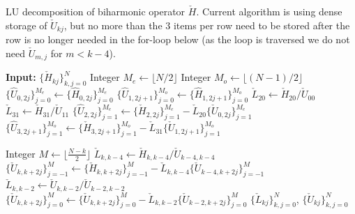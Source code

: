 \documentclass[11pt, oneside]{elsarticle}
\newcommand{\N}[1]{\check{#1}}
\begin{document}
\begin{algorithm}
	\caption{LU decomposition of biharmonic operator $\N{H}$. Current algorithm 
	is using dense storage of $\N{U}_{kj}$, but no more than the 3 items per row
	need 
	to be stored after the row is no longer needed in the for-loop below (as the loop is traversed we do not need $\N{U}_{m, j}$ for $m<k-4$). \label{alg:lu_biharmonic}}
	\begin{algorithmic}[1]
			\State \textbf{Input:} $\{\N{H}_{kj}\}_{k, j = 0}^{N}$
			\State Integer $M_e \gets \lfloor N/2 \rfloor$
			\State Integer $M_o \gets \lfloor (N-1)/2 \rfloor$  
	        \State $\{\hat{U}_{0,2j}\}_{j=0}^{M_e} \gets \{\hat{H}_{0,2j}\}_{j=0}^{M_e}$ 
	        \State $\{\hat{U}_{1,2j+1}\}_{j=0}^{M_o} \gets \{\hat{H}_{1,2j+1}\}_{j=0}^{M_o}$ 
	        \State $\N{L}_{20} \gets \N{H}_{20}/\N{U}_{00}$
	        \State $\N{L}_{31} \gets \N{H}_{31}/\N{U}_{11}$
	        \State $\{\hat{U}_{2,2j}\}_{j=1}^{M_e} \gets \{\N{H}_{2,2j}\}_{j=1}^{M_e} - \N{L}_{20} \{\N{U}_{0,2j}\}_{j=1}^{M_e}$
	        \State $\{\hat{U}_{3,2j+1}\}_{j=1}^{M_o} \gets \{\N{H}_{3,2j+1}\}_{j=1}^{M_o} - \N{L}_{31} \{\N{U}_{1,2j+1}\}_{j=1}^{M_o}$

	            \State Integer $M \gets \lfloor \frac{N-k}{2}\rfloor$
		        \State $\N{L}_{k,k-4} \gets \N{H}_{k, k-4} / \N{U}_{k-4, k-4}$
		        \State $\{\N{U}_{k,k+2j}\}_{j=-1}^{M} \gets \{\N{H}_{k,k+2j}\}_{j=-1}^{M} - \N{L}_{k, k-4} 
		        \{\N{U}_{k-4, k+2j}\}_{j=-1}^{M}$
	            \State $\N{L}_{k,k-2} \gets {\N{U}}_{k,k-2}/{\N{U}}_{k-2, k-2}$
	            \State $\{\N{U}_{k,k+2j}\}_{j=0}^{M} \gets \{{\N{U}}_{k,k+2j}\}_{j=0}^{M} - \N{L}_{k, k-2} \{\N{U}_{k-2,k+2j}\}_{j=0}^{M}$
	        \EndFor
	        \State \Return $\{\N{L}_{kj}\}_{k, j = 0}^{N}$, $\{\N{U}_{kj}\}_{k, 
	        j = 
	        0}^{N}$
		\EndProcedure	
	\end{algorithmic}
\end{algorithm}		
\end{document}
